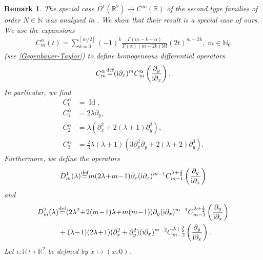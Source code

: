 \documentclass[a4paper,12pt,reqno]{amsart}
\newtheorem{bem}[theorem]{Remark}
\numberwithin{theorem}{subsection}
\numberwithin{equation}{section}
\begin{document}
\begin{bem}\label{special-2} The special case $\Omega^1({\mathbb{R}}^2) \to C^\infty({\mathbb{R}})$
of the second type families of order $N \in {\mathbb{N}}$ was analyzed in \cite{KKP}. We
show that their result is a special case of ours. We use the expansions
\begin{align*}
   C_m^{\alpha}(t) =
   \sum_{k=0}^{[m/2]}(-1)^k \frac{\Gamma(m-k+\alpha)}{\Gamma(\alpha) (m-2k)!k!}(2t)^{m-2k}, \; m \in {\mathbb{N}}_0
\end{align*}
(see \eqref{Gegenbauer-Taylor}) to define homogeneous differential operators
\begin{align*}
    C^\alpha_m {\stackrel{\text{def}}{=}} ({\rm i} \partial_x)^m  C_m^{\alpha}\left(\frac{\partial_y}{{\rm i} \partial_x}\right).
\end{align*}
In particular, we find
\begin{align*}
   C^\alpha_0 & = {\operatorname{Id}},\\
   C^\alpha_1 & = 2\lambda\partial_y,\\
   C^\alpha_2 & = \lambda(\partial_x^2+ 2(\lambda+1) \partial_y^2),\\
   C^\alpha_3 & = \frac 23 \lambda(\lambda+1)(3 \partial_x^2\partial_y + 2(\lambda+2)\partial_y^3  ).
\end{align*}
Furthermore, we define the operators
\begin{equation}\label{eq:KKPOp1}
    D^1_m(\lambda) {\stackrel{\text{def}}{=}} m(2\lambda\!+\!m\!-\!1)\partial_x ({\rm i} \partial_x)^{m-1}
    C^{\lambda + \frac 12}_{m-1}\left(\frac{\partial_y}{{\rm i}\partial_x}\right)
\end{equation}
and
\begin{align}\label{eq:KKPOp2}
    D^2_m(\lambda) & {\stackrel{\text{def}}{=}} (2\lambda^2\!+\!2(m\!-\!1)\lambda\!+\!m(m\!-\!1))\partial_y ({\rm i} \partial_x)^{m-1}
    C^{\lambda+\frac 12}_{m-1}\left(\frac{\partial_y}{{\rm i}\partial_x}\right) \notag \\
    & +(\lambda\!-\!1)(2\lambda\!+\!1)(\partial_x^2 + \partial_y^2)
    ({\rm i} \partial_x)^{m-2}C^{\lambda+\frac 32}_{m-2}\left(\frac{\partial_y}{{\rm i}\partial_x}\right).
\end{align}
Let $\iota: {\mathbb{R}} \hookrightarrow {\mathbb{R}}^2$ be defined by $x \mapsto (x,0)$.


\end{bem}
\end{document}
